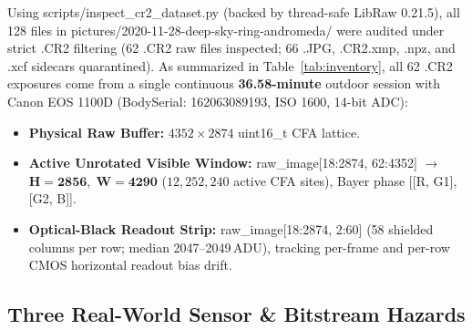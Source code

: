 \documentclass[10pt,twocolumn,letterpaper]{article}
\DeclareRobustCommand{\code}[1]{\texttt{#1}}
\def\code#1{#1}%
\def\allowbreak{}%
\begin{document}
Using \code{scripts/\allowbreak inspect\_cr2\_dataset.py} (backed by thread-safe \code{LibRaw 0.21.5}), all 128 files in \code{pictures/\allowbreak 2020-11-28-deep-sky-ring-andromeda/} were audited under strict \code{.CR2} filtering (\code{62} \code{.CR2} raw files inspected; \code{66} \code{.JPG}, \code{.CR2.xmp}, \code{.npz}, and \code{.xcf} sidecars quarantined). As summarized in Table~\ref{tab:inventory}, all 62 \code{.CR2} exposures come from a single continuous \textbf{36.58-minute} outdoor session with \code{Canon EOS 1100D} (\code{BodySerial: 162063089193}, ISO 1600, 14-bit ADC):
\begin{itemize}
  \item \textbf{Physical Raw Buffer:} $\code{4352} \times \code{2874}$ \code{uint16\_t} CFA lattice.
  \item \textbf{Active Unrotated Visible Window:} \code{raw\_image[18:2874, 62:4352]} $\to$ $\mathbf{H = 2856,\; W = 4290}$ ($12{,}252{,}240$ active CFA sites), Bayer phase \code{[[R, G1], [G2, B]]}.
  \item \textbf{Optical-Black Readout Strip:} \code{raw\_image[18:2874, 2:60]} (\code{58} shielded columns per row; median \code{2047--2049\,ADU}), tracking per-frame and per-row CMOS horizontal readout bias drift.
\end{itemize}

\subsection{Three Real-World Sensor \& Bitstream Hazards}
\end{document}
